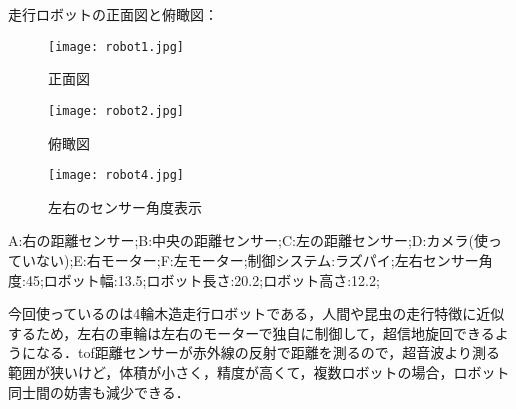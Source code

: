 走行ロボットの正面図と俯瞰図：
\begin{figure}[h]
    \begin{minipage}{0.48\linewidth}
        \centering
        \texttt{[image: robot1.jpg]}
        \caption{正面図}
    \end{minipage}
    \begin{minipage}{0.48\linewidth}
        \centering
        \texttt{[image: robot2.jpg]}
        \caption{俯瞰図}
    \end{minipage}
\end{figure}

\begin{figure}[h]
        \centering
        \texttt{[image: robot4.jpg]}
        \caption{左右のセンサー角度表示}
\end{figure}


A:右の距離センサー;B:中央の距離センサー;C:左の距離センサー;D:カメラ(使っていない);E:右モーター;F:左モーター;制御システム:ラズパイ;左右センサー角度:45\degree;ロボット幅:13.5;ロボット長さ:20.2;ロボット高さ:12.2;



今回使っているのは4輪木造走行ロボットである，人間や昆虫の走行特徴に近似するため，左右の車輪は左右のモーターで独自に制御して，超信地旋回できるようになる．tof距離センサーが赤外線の反射で距離を測るので，超音波より測る範囲が狭いけど，体積が小さく，精度が高くて，複数ロボットの場合，ロボット同士間の妨害も減少できる．

